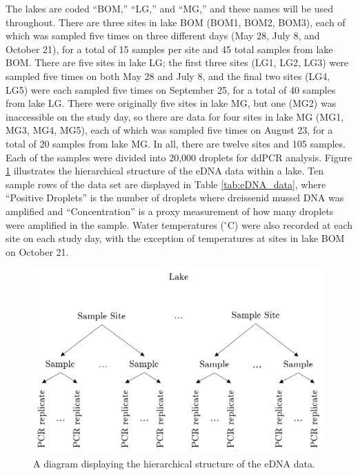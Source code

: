 \documentclass[12pt]{article}\usepackage[]{graphicx}\usepackage[]{color}
\begin{document}
The lakes are coded ``BOM,'' ``LG,'' and ``MG,'' and these names will be used throughout. There are three sites in lake BOM (BOM1, BOM2, BOM3), each of which was sampled five times on three different days (May 28, July 8, and October 21), for a total of 15 samples per site and 45 total samples from lake BOM. There are five sites in lake LG; the first three sites (LG1, LG2, LG3) were sampled five times on both May 28 and July 8, and the final two sites (LG4, LG5) were each sampled five times on September 25, for a total of 40 samples from lake LG. There were originally five sites in lake MG, but one (MG2) was inaccessible on the study day, so there are data for four sites in lake MG (MG1, MG3, MG4, MG5), each of which was sampled five times on August 23, for a total of 20 samples from lake MG. In all, there are twelve sites and 105 samples. Each of the samples were divided into 20,000 droplets for ddPCR analysis. Figure \ref{fig:eDNA_diagram} illustrates the hierarchical structure of the eDNA data within a lake. Ten sample rows of the data set are displayed in Table \ref{tab:eDNA_data}, where ``Positive Droplets'' is the number of droplets where dreissenid mussel DNA was amplified and ``Concentration'' is a proxy measurement of how many droplets were amplified in the sample. Water temperatures ($^\circ$C) were also recorded at each site on each study day, with the exception of temperatures at sites in lake BOM on October 21. 

\begin{figure}[]
	\centering
	\includegraphics[scale = 0.7]{eDNA}
	\caption{A diagram displaying the hierarchical structure of the eDNA data.}
	\label{fig:eDNA_diagram}
\end{figure}
\end{document}
